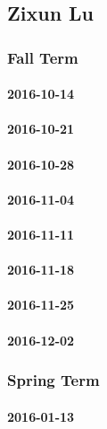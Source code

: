\subsection{Zixun Lu}

\subsubsection{Fall Term}

\paragraph{2016-10-14}

\paragraph{2016-10-21}

\paragraph{2016-10-28}

\paragraph{2016-11-04}

\paragraph{2016-11-11}

\paragraph{2016-11-18}

\paragraph{2016-11-25}

\paragraph{2016-12-02}

\subsubsection{Spring Term}

\paragraph{2016-01-13}


